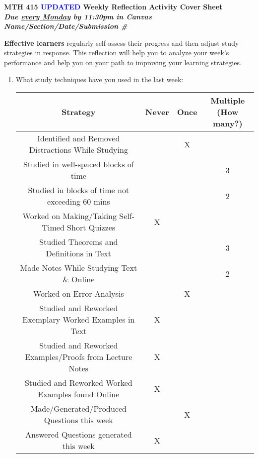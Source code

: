 \documentclass[11pt]{article}
\begin{document}
\begin{center}
\Large \bfseries MTH 415 \textcolor{blue}{UPDATED} Weekly Reflection Activity Cover Sheet\\ 
{\it Due \underline{every Monday} by 11:30pm in Canvas}\\ 
\smallskip
\it Name/Section/Date/Submission \# 
\end{center}

{\bf Effective learners} regularly self-assess their progress and then adjust study strategies in response. This reflection will help you to analyze your week's performance and help you on your path to improving your learning strategies.

\begin{enumerate}

\item What study techniques have you used in the last week:\\
	
	\begin{tabular}{|c|c|c|c|}
		\hline
		 {\bf Strategy} & {\bf Never} & {\bf Once} & {\bf Multiple (How many?)}\\
		\hline
		Identified and Removed Distractions While Studying &&X&\\
		\hline
		Studied in well-spaced blocks of time &&&3\\
		\hline
		Studied in blocks of time not exceeding 60 mins &&&2\\
		\hline
		Worked on Making/Taking Self-Timed Short Quizzes &X&&\\
		\hline
		\hline


		Studied Theorems and Definitions in Text&&&3\\
		\hline 
		Made Notes While Studying Text \& Online&&&2\\
		\hline 
		Worked on Error Analysis&&X&\\
		\hline 
		\hline
		 
		Studied and Reworked Exemplary Worked Examples in Text &X&&\\
		\hline 
		Studied and Reworked Examples/Proofs from Lecture Notes &X&&\\
		\hline 
		Studied and Reworked Worked Examples found Online &X&&\\
		\hline 
		\hline


		Made/Generated/Produced Questions this week &&X&\\
		\hline
		Answered Questions generated this week &X&&\\
		\hline
		\hline
		

\end{tabular}
\end{enumerate}
\end{document}
